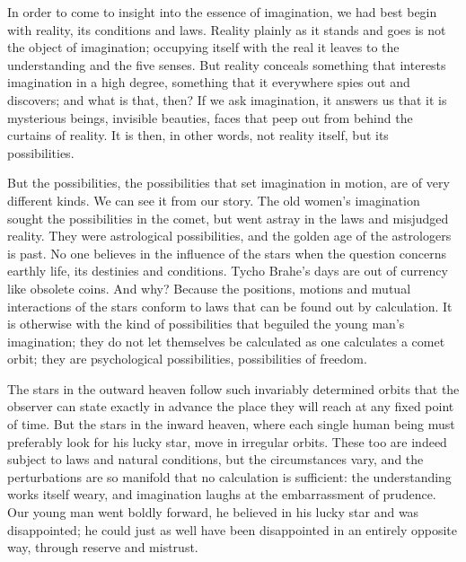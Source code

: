 \documentclass[12pt,a4paper,openany]{book}
\newcommand{\opage}[1]{\marginnote{\footnotesize\textit{[#1]}}}
\begin{document}
In order to come to insight into the essence of imagination, we had best begin with reality, its conditions and laws.
Reality plainly as it stands and goes is not the object of imagination; occupying itself with the real it leaves to
the understanding and the five senses. But reality conceals something that interests imagination in a high degree,
something that it everywhere spies out and discovers; and what is that, then? If we ask imagination, it answers us that
it is mysterious beings, invisible beauties, faces that peep out from behind the curtains of reality. It is then, in
other words, not reality itself, but its possibilities.

But the possibilities, the possibilities that set imagination in motion, are of very different kinds. We can see it
from our story. The old women's imagination sought the possibilities in the comet, but went astray in the laws and
misjudged reality. They were astrological possibilities, and the golden age of the astrologers is past. No one believes
in the influence of the stars when the question concerns earthly life, its destinies and conditions. Tycho Brahe's days
are out of currency like obsolete coins. And why? Because the positions, motions and mutual interactions of the stars
conform to laws that can be found out by calculation. It is otherwise with the kind of possibilities that beguiled the
young man's imagination; they do not let themselves be calculated as one calculates a comet
\setcounter{footnote}{0}%
\opage{7}orbit; they are psychological possibilities, possibilities of freedom.

The stars in the outward heaven follow such invariably determined orbits that the observer can state exactly in
advance the place they will reach at any fixed point of time. But the stars in the inward heaven, where each single
human being must preferably look for his lucky star, move in irregular orbits. These too are indeed subject to laws
and natural conditions, but the circumstances vary, and the perturbations are so manifold that no calculation is
sufficient: the understanding works itself weary, and imagination laughs at the embarrassment of prudence. Our young
man went boldly forward, he believed in his lucky star and was disappointed; he could just as well have been
disappointed in an entirely opposite way, through reserve and mistrust.
\end{document}
